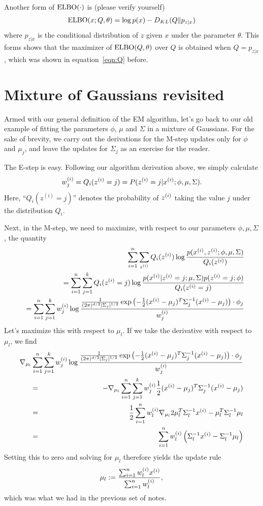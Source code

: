 \documentclass{article}
\begin{document}
Another form of $\elbo(\cdot)$ is (please verify yourself)
\begin{align}
\elbo(x; Q,\theta) = \log p(x) - \kl(Q\|p_{z|x})
\end{align}
where $p_{z|x}$ is the conditional distribution of $z$ given $x$ under the parameter $\theta$. This forms shows that the maximizer of $\elbo(Q,\theta)$ over $Q$ is obtained when $Q = p_{z|x}$, which was shown in equation~\eqref{eqn:Q} before. 
\section{Mixture of Gaussians revisited}\label{sec:gmm}

Armed with our general definition of the EM algorithm, let's go back
to our old
example of fitting the parameters $\phi$, $\mu$ and $\Sigma$ in
a mixture of Gaussians.  For the sake of brevity, we carry out
the derivations for the M-step updates only for $\phi$ and $\mu_j$,
and leave the updates for $\Sigma_j$ as an exercise for the reader.

The E-step is easy.  Following our algorithm derivation above,
we simply calculate
\[
w^{(i)}_j = Q_i(z^{(i)}=j) = P(\zsi=j | \xsi; \phi, \mu, \Sigma).
\]
Here, ``$Q_i(z^{(i)}=j)$'' denotes the probability of $\zsi$ taking the
value $j$
under the distribution $Q_i$.

Next, in the M-step, we need to maximize, with respect to our parameters
$\phi, \mu, \Sigma$, the quantity
\begin{eqnarray*}
&&\hbox to -0.3in{}\sum_{i=1}^\nexp \sum_{\zsi} Q_i(\zsi)
   \log \frac{p(\xsi, \zsi; \phi, \mu, \Sigma)}{Q_i(\zsi)}  \\
&&= \sum_{i=1}^\nexp \sum_{j=1}^k Q_i(\zsi=j) \log \frac{p(\xsi| \zsi = j; \mu, \Sigma) p(\zsi=j; \phi)}{Q_i(\zsi=j)}  \\
&&=
\sum_{i=1}^\nexp \sum_{j=1}^k w^{(i)}_j \log \frac{\frac{1}{(2\pi)^{\di/2}|\Sigma_j|^{1/2}}
\exp\left(-\frac{1}{2}(\xsi-\mu_j)^T\Sigma_j^{-1}(\xsi-\mu_j)\right) \cdot \phi_j}
{w^{(i)}_j}
\end{eqnarray*}
Let's maximize this with respect to $\mu_l$.  If we take the
derivative with respect to $\mu_l$, we find
\begin{eqnarray*}
&&\hbox to -0.5in{}
\nabla_{\mu_l} \sum_{i=1}^\nexp \sum_{j=1}^k w^{(i)}_j \log \frac{\frac{1}{(2\pi)^{\di/2}|\Sigma_j|^{1/2}}
\exp\left(-\frac{1}{2}(\xsi-\mu_j)^T\Sigma_j^{-1}(\xsi-\mu_j)\right) \cdot \phi_j}
{w^{(i)}_j} \\
\hbox to 0.2in{}&=&
- \nabla_{\mu_l} \sum_{i=1}^\nexp \sum_{j=1}^k w^{(i)}_j
\frac{1}{2}(\xsi-\mu_j)^T\Sigma_j^{-1}(\xsi-\mu_j) \\
&=&
\frac{1}{2} \sum_{i=1}^\nexp w^{(i)}_l \nabla_{\mu_l}
2 \mu_l^T \Sigma_l^{-1} \xsi - \mu_l^T\Sigma_l^{-1}\mu_l \\
&=&
\sum_{i=1}^\nexp w^{(i)}_l
\left( \Sigma_l^{-1}\xsi - \Sigma_l^{-1}\mu_l \right)
\end{eqnarray*}
Setting this to zero and solving for $\mu_l$ therefore yields the
update rule
\[
\mu_l := \frac{\sum_{i=1}^\nexp w^{(i)}_l    \xsi}{\sum_{i=1}^\nexp w^{(i)}_l    }, \\
\]
which was what we had in the previous set of notes.
\end{document}
